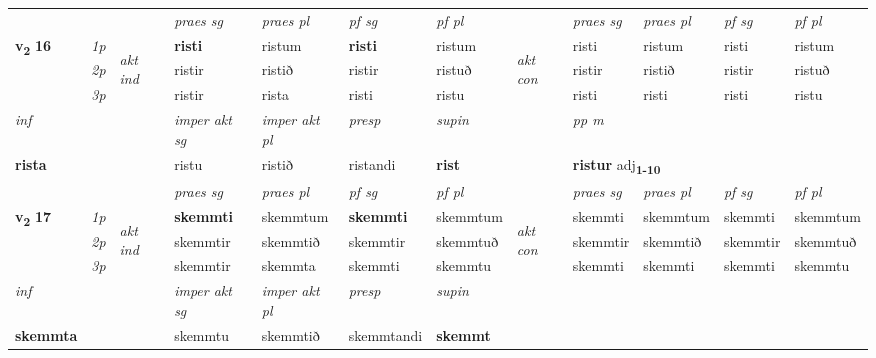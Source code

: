 \begin{longtable}[l]{X>{\footnotesize\itshape}llXXXXlXXXX}
 & &   & \textit{praes sg}  & \textit{praes pl}    & \textit{ pf sg} & \textit{pf pl} & & \textit{praes sg}  & \textit{praes pl}    & \textit{pf sg} & \textit{pf pl }  \\ \cmidrule{4-7} \cmidrule{9-12}
 \multirow{2}{*}{{{\textbf{v{\textsubscript{2}}} \Large{\textbf{16}}}}}  & 1p & \multirow{3}{*}{\begin{turn}{90}\textit{akt ind}\end{turn}} & \textbf{risti} & ristum & \textbf{risti} & ristum & \multirow{3}{*}{\begin{turn}{90}\textit{akt con}\end{turn}} &risti & ristum & risti & ristum\\*
 & 2p &  &  ristir  & ristið & ristir & ristuð & & ristir & ristið & ristir & ristuð \\*
 & 3p &  & ristir & rista & risti & ristu & & risti & risti& risti & ristu \\*
\cmidrule{4-7} \cmidrule{9-12}

   {\textit{inf}} & &  & \textit{imper akt sg} & \textit{imper akt pl}   & \textit{presp} & \textit{supin}  && \textit{pp m} \\*
  {\textbf{rista}} & && ristu  & ristið   & ristandi &  \textbf{rist}  && \multicolumn{2}{l}{\textbf{ristur} adj\textbf{\textsubscript{1-10}}} \\*

\midrule

 & &   & \textit{praes sg}  & \textit{praes pl}    & \textit{ pf sg} & \textit{pf pl} & & \textit{praes sg}  & \textit{praes pl}    & \textit{pf sg} & \textit{pf pl }  \\ \cmidrule{4-7} \cmidrule{9-12}
 \multirow{2}{*}{{{\textbf{v{\textsubscript{2}}} \Large{\textbf{17}}}}}  & 1p & \multirow{3}{*}{\begin{turn}{90}\textit{akt ind}\end{turn}} & \textbf{skemmti} & skemmtum & \textbf{skemmti} & skemmtum & \multirow{3}{*}{\begin{turn}{90}\textit{akt con}\end{turn}} &skemmti & skemmtum & skemmti & skemmtum\\*
 & 2p &  &  skemmtir  & skemmtið & skemmtir & skemmtuð & & skemmtir & skemmtið & skemmtir & skemmtuð \\*
 & 3p &  & skemmtir & skemmta & skemmti & skemmtu & & skemmti & skemmti& skemmti & skemmtu \\*
\cmidrule{4-7} \cmidrule{9-12}

   {\textit{inf}} & &  & \textit{imper akt sg} & \textit{imper akt pl}   & \textit{presp} & \textit{supin}   \\*
  {\textbf{skemmta}} & && skemmtu  & skemmtið   & skemmtandi &  \textbf{skemmt}   \\*


\end{longtable}
